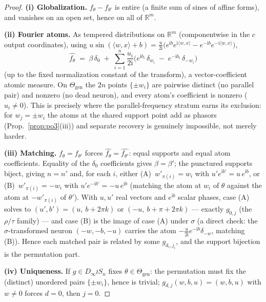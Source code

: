\documentclass[11pt]{article}
\newcommand{\R}{\mathbb{R}}
\newcommand{\Dinf}{D_\infty}
\begin{document}
\begin{proof}
\textbf{(i) Globalization.} $f_\theta-f_{\theta'}$ is entire (a finite sum of sines of affine
forms), and vanishes on an open set, hence on all of $\R^m$.

\textbf{(ii) Fourier atoms.} As tempered distributions on $\R^m$ (componentwise in the $c$ output
coordinates), using $u\sin(\langle w,x\rangle+b)=\frac{u}{2\mathrm i}\big(e^{\mathrm i b}
e^{\mathrm i\langle w,x\rangle}-e^{-\mathrm i b}e^{-\mathrm i\langle w,x\rangle}\big)$,
\[
\widehat{f_\theta}\;=\;\beta\,\delta_0\;+\;\sum_{i=1}^n \frac{u_i}{2\mathrm i}
\Big(e^{\mathrm i b_i}\,\delta_{w_i}\;-\;e^{-\mathrm i b_i}\,\delta_{-w_i}\Big)
\]
(up to the fixed normalization constant of the transform), a vector-coefficient atomic measure.
On $\Theta_{\mathrm{gen}}$ the $2n$ points $\{\pm w_i\}$ are pairwise distinct (no parallel pair)
and nonzero (no dead neuron), and every atom's coefficient is nonzero ($u_i\ne0$). This is
precisely where the parallel-frequency stratum earns its exclusion: for $w_j=\pm w_i$ the atoms
at the shared support point add as phasors (Prop.~\ref{prop:po3}(iii)) and separate recovery is
genuinely impossible, not merely harder.

\textbf{(iii) Matching.} $f_\theta=f_{\theta'}$ forces $\widehat{f_\theta}=\widehat{f_{\theta'}}$:
equal supports and equal atom coefficients. Equality of the $\delta_0$ coefficients gives
$\beta=\beta'$; the punctured supports biject, giving $n=n'$ and, for each $i$, either
(A)~$w'_{\pi(i)}=w_i$ with $u'e^{\mathrm i b'}=u\,e^{\mathrm i b}$, or
(B)~$w'_{\pi(i)}=-w_i$ with $u'e^{-\mathrm i b'}=-u\,e^{\mathrm i b}$ (matching the atom at
$w_i$ of $\theta$ against the atom at $-w'_{\pi(i)}$ of $\theta'$). With $u,u'$ real vectors and
$e^{\mathrm i b}$ scalar phases, case (A) solves to
$(u',b')=(u,\ b+2\pi k)$ or $(-u,\ b+\pi+2\pi k)$ — exactly $g_{0,j}$ (the $\rho/\tau$ family) —
and case (B) is the image of case (A) under $\sigma$ (a direct check: the $\sigma$-transformed
neuron $(-w,-b,-u)$ carries the atom $-\frac{u}{2\mathrm i}e^{-\mathrm i b}\delta_{-w}$, matching
(B)). Hence each matched pair is related by some $g_{d_i,j_i}$, and the support bijection is the
permutation part.

\textbf{(iv) Uniqueness.} If $g\in\Dinf\wr S_n$ fixes $\theta\in\Theta_{\mathrm{gen}}$: the
permutation must fix the (distinct) unordered pairs $\{\pm w_i\}$, hence is trivial;
$g_{d,j}(w,b,u)=(w,b,u)$ with $w\ne0$ forces $d=0$, then $j=0$. \qedhere
\end{proof}
\end{document}
